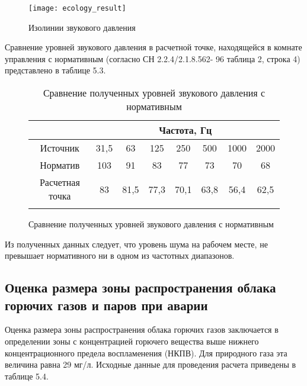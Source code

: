 \begin{figure}[H]
	\centering
	\texttt{[image: ecology\_result]}
	\caption{Изолинии звукового давления}
\end{figure}

Сравнение уровней звукового давления в расчетной точке, находящейся в комнате управления с нормативным (согласно СН 2.2.4/2.1.8.562-
96 таблица 2, строка 4) представлено в таблице 5.3.
 
\begin{figure}
\begin{longtable}{|c|c|c|c|c|c|c|c|}
    \hline
    \multicolumn{1}{|c}{}& \multicolumn{7}{c|}{Частота, Гц} \\ \hline
    Источник & 31,5 & 63 & 125 & 250 & 500 & 1000 & 2000 \\ \hline
	Норматив & 103 & 91 & 83 & 77 & 73 & 70 & 68 \\ \hline
	Расчетная точка & 83 & 81,5 & 77,3 & 70,1 & 63,8 & 56,4 & 62,5 \\ \hline   
    \caption{Сравнение полученных уровней звукового давления с нормативным} \label{tab:ecology_noise_norm}
\end{longtable}
\end{figure}

Из полученных данных следует, что уровень шума на рабочем месте, не превышает нормативного ни в одном из частотных диапазонов. 

\subsection{Оценка размера зоны распространения облака горючих газов и паров при аварии} %
\label{sub:ecology_cloud}
 
Оценка размера зоны распространения облака горючих газов заключается в определении зоны с концентрацией горючего вещества выше нижнего концентрационного предела воспламенения (НКПВ). Для природного газа эта величина равна 29 мг/л.
Исходные данные для проведения расчета приведены в таблице 5.4.

